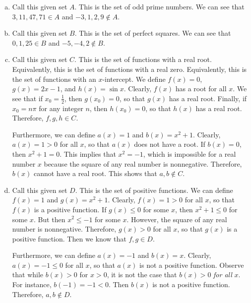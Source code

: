 \documentclass[11pt,letterpaper]{article}
\begin{document}
\sol 
\begin{enumerate}[(a)]
\item Call this given set $A$. This is the set of odd prime numbers. We can see that $3, 11, 47, 71 \in A$ and $-3, 1, 2, 9 \notin A$. \pspace

\item Call this given set $B$. This is the set of perfect squares. We can see that $0, 1, 25 \in B$ and $-5, -4, 2 \notin B$. \pspace

\item Call this given set $C$. This is the set of functions with a real root. Equivalently, this is the set of functions with a real zero. Equivalently, this is the set of functions with an $x$-intercept. We define $f(x)= 0$, $g(x)= 2x - 1$, and $h(x)= \sin x$. Clearly, $f(x)$ has a root for all $x$. We see that if $x_0= \frac{1}{2}$, then $g(x_0)= 0$, so that $g(x)$ has a real root. Finally, if $x_0= n\pi$ for any integer $n$, then $h(x_0)= 0$, so that $h(x)$ has a real root. Therefore, $f, g, h \in C$. \par\vspace{0.2cm}

Furthermore, we can define $a(x)= 1$ and $b(x)= x^2 + 1$. Clearly, $a(x)= 1 > 0$ for all $x$, so that $a(x)$ does not have a root. If $b(x)= 0$, then $x^2 + 1= 0$. This implies that $x^2= -1$, which is impossible for a real number $x$ because the square of any real number is nonnegative. Therefore, $b(x)$ cannot have a real root. This shows that $a, b \notin C$. \pspace

\item Call this given set $D$. This is the set of positive functions. We can define $f(x)= 1$ and $g(x)= x^2 + 1$. Clearly, $f(x)= 1 > 0$ for all $x$, so that $f(x)$ is a positive function. If $g(x) \leq 0$ for some $x$, then $x^2 + 1 \leq 0$ for some $x$. But then $x^2 \leq -1$ for some $x$. However, the square of any real number is nonnegative. Therefore, $g(x) > 0$ for all $x$, so that $g(x)$ is a positive function. Then we know that $f, g \in D$. \par\vspace{0.2cm}

Furthermore, we can define $a(x)= -1$ and $b(x)= x$. Clearly, $a(x)= -1 \leq 0$ for all $x$, so that $a(x)$ is not a positive function. Observe that while $b(x) > 0$ for $x > 0$, it is not the case that $b(x) > 0$ \textit{for all} $x$. For instance, $b(-1)= -1 < 0$. Then $b(x)$ is not a positive function. Therefore, $a, b \notin D$. \pspace


\end{enumerate}
\end{document}
